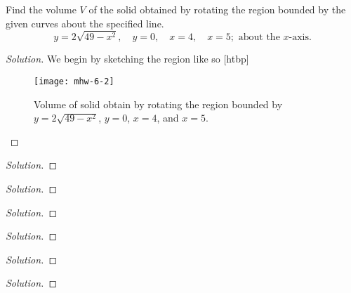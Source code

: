 \begin{problem}[WebAssign, HW 6, 2]
  Find the volume $V$ of the solid obtained by rotating the region bounded by
  the given curves about the specified line.
  \[
    y=2\sqrt{49-x^2},\quad y=0,\quad x=4,\quad x=5;\text{ about the $x$-axis.}
  \]
\end{problem}
\begin{proof}[Solution]
We begin by sketching the region like so
[htbp]
\begin{figure}[htbp]
  \centering
 \texttt{[image: mhw-6-2]}
  \caption{Volume of solid obtain by rotating the region bounded by
    $y=2\sqrt{49-x^2}$, $y=0$, $x=4$, and $x=5$.}
  \label{fig:hw-6-2}
\end{figure}
\end{proof}


\begin{problem}[WebAssign, HW 6, 3]
\end{problem}
\begin{proof}[Solution]
\end{proof}


\begin{problem}[WebAssign, HW 6, 4]
\end{problem}
\begin{proof}[Solution]
\end{proof}


\begin{problem}[WebAssign, HW 6, 5]
\end{problem}
\begin{proof}[Solution]
\end{proof}


\begin{problem}[WebAssign, HW 6, 6]
\end{problem}
\begin{proof}[Solution]
\end{proof}


\begin{problem}[WebAssign, HW 6, 7]
\end{problem}
\begin{proof}[Solution]
\end{proof}


\begin{problem}[WebAssign, HW 6, 8]
\end{problem}
\begin{proof}[Solution]
\end{proof}

